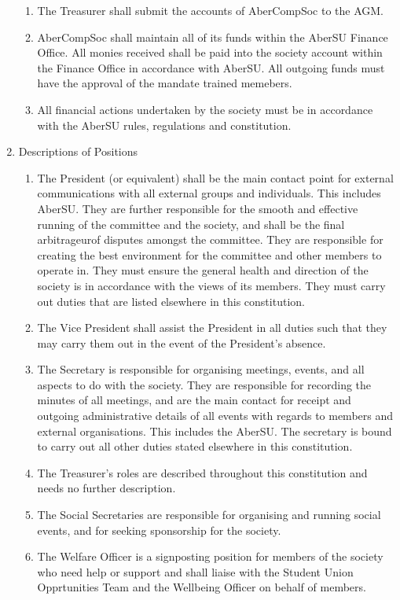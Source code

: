 \documentclass{article}
\begin{document}
\begin{enumerate}
\begin{enumerate}
            \item The Treasurer shall submit the accounts of AberCompSoc to the AGM.
            \item AberCompSoc shall maintain all of its funds within the AberSU Finance Office. All monies received shall be paid into the society account within the Finance Office in accordance with AberSU. All outgoing funds must have the approval of the mandate trained memebers.
            \item All financial actions undertaken by the society must be in accordance with the AberSU rules, regulations and constitution.
        \end{enumerate}
    \item Descriptions of Positions
        \begin{enumerate}
            \item The President (or equivalent) shall be the main contact point for external communications with all external groups and individuals. This includes AberSU. They are further responsible for the smooth and effective running of the committee and the society, and shall be the final arbitrageurof disputes amongst the committee. They are responsible for creating the best environment for the committee and other members to operate in. They must ensure the general health and direction of the society is in accordance with the views of its members. They must carry out duties that are listed elsewhere in this constitution.
            \item The Vice President shall assist the President in all duties such that they may carry them out in the event of the President's absence.
            \item The Secretary is responsible for organising meetings, events, and all aspects to do with the society. They are responsible for recording the minutes of all meetings, and are the main contact for receipt and outgoing administrative details of all events with regards to members and external organisations. This includes the AberSU. The secretary is bound to carry out all other duties stated elsewhere in this constitution.
            \item The Treasurer’s roles are described throughout this constitution and needs no further description.
            \item The Social Secretaries are responsible for organising and running social events, and for seeking sponsorship for the society.
            \item The Welfare Officer is a signposting position for members of the society who need help or support and shall liaise with the Student Union Opprtunities Team and the Wellbeing Officer on behalf of members.

\end{enumerate}
\end{enumerate}
\end{document}
